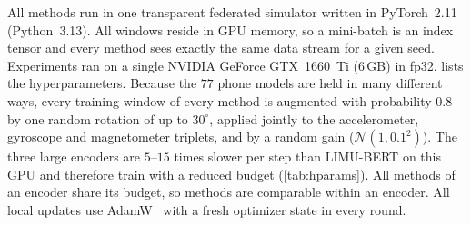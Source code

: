 All methods run in one transparent federated simulator written in PyTorch~2.11 (Python~3.13).
All windows reside in GPU memory, so a mini-batch is an index tensor and every method sees
exactly the same data stream for a given seed. Experiments ran on a single NVIDIA GeForce
GTX~1660~Ti (6\,GB) in fp32.  lists the hyperparameters. Because the $77$ phone
models are held in many different ways, every training window of every method is augmented with
probability $0.8$ by one random rotation of up to $30^\circ$, applied jointly to the accelerometer,
gyroscope and magnetometer triplets, and by a random gain ($\mathcal{N}(1,0.1^2)$). The three large
encoders are $5$--$15$ times slower per step than LIMU-BERT on this GPU and therefore train with a
reduced budget (\cref{tab:hparams}). All methods of an encoder share its budget, so methods are
comparable within an encoder. All local updates use AdamW~\cite{loshchilov2019adamw} with a fresh
optimizer state in every round.

